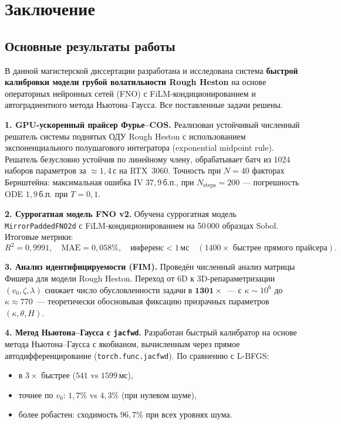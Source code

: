 
\section*{Заключение}
\label{sec:conclusion}

\subsection*{Основные результаты работы}

В данной магистерской диссертации разработана и исследована система
\textbf{быстрой калибровки модели грубой волатильности Rough Heston}
на основе операторных нейронных сетей (FNO) с FiLM-кондиционированием
и автоградиентного метода Ньютона--Гаусса. Все поставленные задачи решены.

\medskip
\textbf{1. GPU-ускоренный прайсер Фурье--COS.}
Реализован устойчивый численный решатель системы поднятых ОДУ Rough Heston
с использованием экспоненциального полушагового интегратора (exponential
midpoint rule). Решатель безусловно устойчив по линейному члену, обрабатывает
батч из 1024 наборов параметров за $\approx 1{,}4\,\text{с}$ на RTX~3060.
Точность при $N=40$ факторах Бернштейна: максимальная ошибка IV $37{,}9\,\text{б.п.}$,
при $N_{\text{steps}}=200$ --- погрешность ODE $1{,}9\,\text{б.п.}$ при $T=0{,}1$.

\medskip
\textbf{2. Суррогатная модель FNO v2.}
Обучена суррогатная модель \texttt{MirrorPaddedFNO2d} с FiLM-кондиционированием
на 50\,000 образцах Sobol. Итоговые метрики:
\[
  R^2 = 0{,}9991, \quad \text{MAE} = 0{,}058\%, \quad
  \text{инференс} < 1\,\text{мс} \quad (1400\times\text{ быстрее прямого прайсера}).
\]

\medskip
\textbf{3. Анализ идентифицируемости (FIM).}
Проведён численный анализ матрицы Фишера для модели Rough Heston.
Переход от 6D к 3D-репараметризации $(v_0, \zeta, \lambda)$ снижает
число обусловленности задачи в $\mathbf{1301\times}$~---
с $\kappa \sim 10^6$ до $\kappa \approx 770$~--- теоретически обосновывая
фиксацию призрачных параметров $(\kappa, \theta, H)$.

\medskip
\textbf{4. Метод Ньютона--Гаусса с \texttt{jacfwd}.}
Разработан быстрый калибратор на основе метода Ньютона--Гаусса
с якобианом, вычисленным через прямое автодифференцирование
(\texttt{torch.func.jacfwd}). По сравнению с L-BFGS:
\begin{itemize}
  \item в $3\times$ быстрее ($541$ vs $1599\,\text{мс}$),
  \item точнее по $v_0$: $1{,}7\%$ vs $4{,}3\%$ (при нулевом шуме),
  \item более робастен: сходимость $96{,}7\%$ при всех уровнях шума.
\end{itemize}

